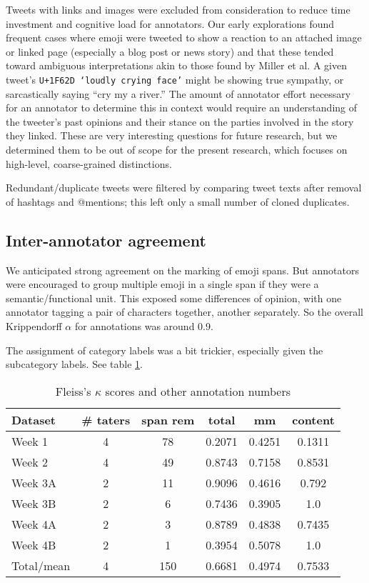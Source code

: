 \documentclass[11pt]{article}
\begin{document}
Tweets with links and images were excluded from consideration to reduce time investment and cognitive load for annotators. Our early explorations found frequent cases where emoji were tweeted to show a reaction to an attached image or linked page (especially a blog post or news story) and that these tended toward ambiguous interpretations akin to those found by Miller et al. A given tweet's \texttt{U+1F62D `loudly crying face'} might be showing true sympathy, or sarcastically saying ``cry my a river.'' The amount of annotator effort necessary for an annotator to determine this in context would require an understanding of the tweeter's past opinions and their stance on the parties involved in the story they linked. These are very interesting questions for future research, but we determined them to be out of scope for the present research, which focuses on high-level, coarse-grained distinctions.

Redundant/duplicate tweets were filtered by comparing tweet texts after removal of hashtags and @mentions; this left only a small number of cloned duplicates.

\subsection{Inter-annotator agreement}

We anticipated strong agreement on the marking of emoji spans. But annotators were encouraged to group multiple emoji in a single span if they were a semantic/functional unit.
This exposed some differences of opinion, with one annotator tagging a pair of characters together, another separately. So the overall Krippendorff $\alpha$ for annotations was around 0.9. 

The assignment of category labels was a bit trickier, especially given the subcategory labels. See table \ref{tab:IAA}.

\begin{table}[htbp]
  \centering
  \begin{tabular}{@{} |lccccc| @{}}
    \hline
    Dataset & \# taters & span rem & total & mm & content \\
    \hline
    Week 1     & 4 & 78 & 0.2071  & 0.4251  & 0.1311  \\
    Week 2     & 4 & 49 & 0.8743  & 0.7158  & 0.8531  \\
    Week 3A    & 2 & 11 & 0.9096  & 0.4616  & 0.792  \\
    Week 3B    & 2 & 6  & 0.7436  & 0.3905  & 1.0  \\
    Week 4A    & 2 & 3  & 0.8789  & 0.4838  & 0.7435  \\
    Week 4B    & 2 & 1  & 0.3954  & 0.5078  & 1.0  \\
    \hline
    Total/mean & 4 & 150 & 0.6681 & 0.4974  & 0.7533  \\
    \hline
  \end{tabular}
  \caption{Fleiss's $\kappa$ scores and other annotation numbers}
  \label{tab:IAA}
\end{table}
\end{document}
